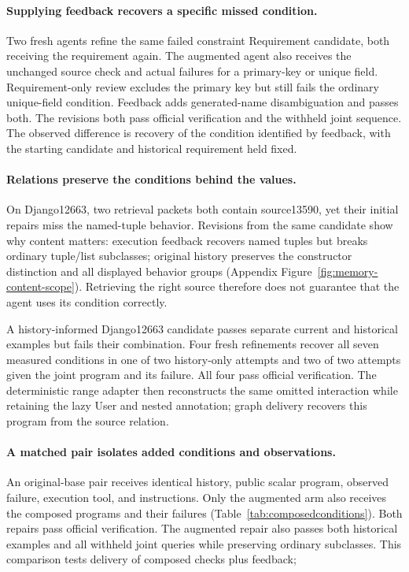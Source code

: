 \paragraph{Supplying feedback recovers a specific missed condition.}
Two fresh agents refine the same failed constraint Requirement candidate,
both receiving the requirement again. The augmented agent also receives the
unchanged source check and actual failures for a primary-key or unique field.
Requirement-only review excludes the primary key but still fails the ordinary
unique-field condition. Feedback adds generated-name disambiguation and passes
both. The revisions both pass official verification and the withheld joint
sequence. The observed difference is recovery of the condition identified by
feedback, with the starting candidate and historical requirement held fixed.

\paragraph{Relations preserve the conditions behind the values.}
\label{sec:composition-results}
On Django12663, two retrieval packets both contain source13590, yet their
initial repairs miss the named-tuple behavior. Revisions from the same candidate
show why content matters: execution feedback recovers named tuples but breaks
ordinary tuple/list subclasses; original history preserves the constructor
distinction and all displayed behavior groups
(Appendix Figure~\ref{fig:memory-content-scope}). Retrieving the right source
therefore does not guarantee that the agent uses its condition correctly.

A history-informed Django12663 candidate passes separate
current and historical examples but fails their combination. Four fresh
refinements recover all seven measured conditions in one of two history-only
attempts and two of two attempts given the joint program and its failure.
All four pass official verification. The deterministic range adapter then
reconstructs the same omitted interaction while retaining the lazy User and
nested annotation; graph delivery recovers this program from the source relation.

\paragraph{A matched pair isolates added conditions and observations.}
An original-base pair receives identical history, public scalar program,
observed failure, execution tool, and instructions. Only the augmented arm
also receives the composed programs and their failures
(Table~\ref{tab:composedconditions}). Both repairs pass official verification.
The augmented repair also passes both historical examples and all withheld
joint queries while preserving ordinary subclasses. This comparison tests
delivery of composed checks plus feedback; 

